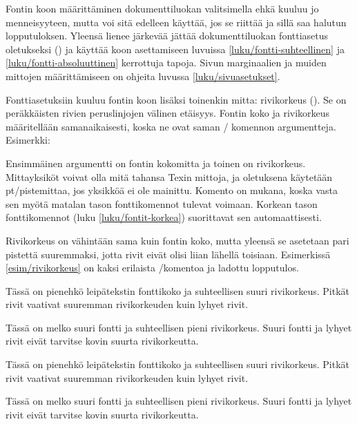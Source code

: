 Fontin koon määrittäminen dokumenttiluokan valitsimella ehkä kuuluu jo
menneisyyteen, mutta voi sitä edelleen käyttää, jos se riittää ja sillä
saa halutun lopputuloksen. Yleensä lienee järkevää jättää
dokumenttiluokan fonttiasetus oletukseksi (\koodi{10pt}) ja käyttää koon
asettamiseen luvuissa \ref{luku/fontti-suhteellinen} ja
\ref{luku/fontti-absoluuttinen} kerrottuja tapoja. Sivun marginaalien ja
muiden mittojen määrittämiseen on ohjeita luvussa
\ref{luku/sivuasetukset}.

Fonttiasetuksiin kuuluu fontin koon lisäksi toinenkin mitta: rivikorkeus
(). Se on peräkkäisten rivien peruslinjojen välinen
etäisyys. Fontin koko ja rivikorkeus määritellään samanaikaisesti, koska
ne ovat saman \-/ komennon argumentteja. Esimerkki:

\begin{koodilohkosis}
\fontsize{10bp}{12bp} \selectfont
\end{koodilohkosis}

\noindent
Ensimmäinen argumentti on fontin kokomitta ja toinen on rivikorkeus.
Mittayksiköt voivat olla mitä tahansa Texin mittoja, ja oletuksena
käytetään pt\-/pistemittaa, jos yksikköä ei ole mainittu. Komento
 on mukana, koska vasta sen myötä matalan tason
fonttikomennot tulevat voimaan. Korkean tason fonttikomennot (luku
\ref{luku/fontit-korkea}) suorittavat sen automaattisesti.

Rivikorkeus on vähintään sama kuin fontin koko, mutta yleensä se
asetetaan pari pistettä suuremmaksi, jotta rivit eivät olisi liian
lähellä toisiaan. Esimerkissä \ref{esim/rivikorkeus} on kaksi erilaista
\-/komentoa ja ladottu lopputulos.

\begin{esimerkki*}

\begin{koodilohko}
\fontsize{8bp}{11bp}\selectfont Tässä on pienehkö leipätekstin
fonttikoko ja suhteellisen suuri rivikorkeus. Pitkät rivit vaativat
suuremman rivikorkeuden kuin lyhyet rivit.

\fontsize{16bp}{17bp}\selectfont Tässä on melko suuri fontti ja
suhteellisen pieni rivikorkeus. Suuri fontti ja lyhyet rivit eivät
tarvitse kovin suurta rivikorkeutta.
\end{koodilohko}
  \begin{tulos}
    \fontsize{8bp}{11bp}\selectfont Tässä on pienehkö leipätekstin
    fonttikoko ja suhteellisen suuri rivikorkeus. Pitkät rivit vaativat
    suuremman rivikorkeuden kuin lyhyet rivit.

    \fontsize{16bp}{17bp}\selectfont Tässä on melko suuri fontti ja
    suhteellisen pieni rivikorkeus. Suuri fontti ja lyhyet rivit eivät
    tarvitse kovin suurta rivikorkeutta.
  \end{tulos}
  \caption{Fontin koon ja rivikorkeuden asettaminen ja vaikutus}
  \label{esim/rivikorkeus}
\end{esimerkki*}

